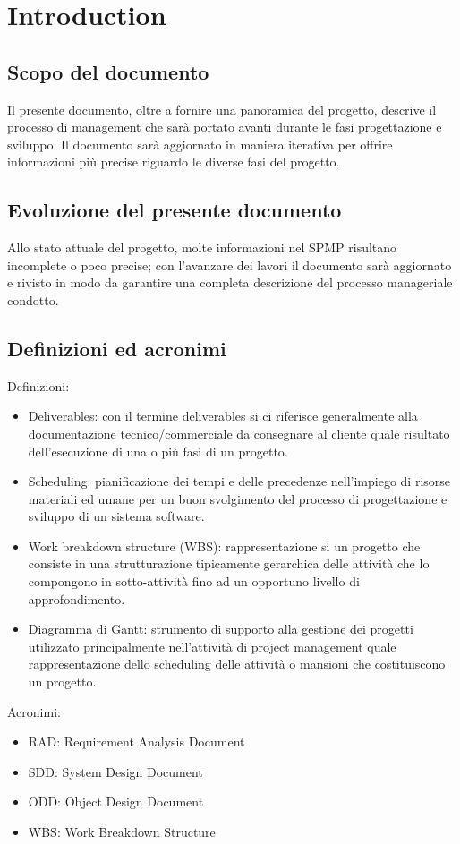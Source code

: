 \chapter{Introduction}
	
\section{Scopo del documento}
		
Il presente documento, oltre a fornire una panoramica del progetto, descrive il processo di management che sarà portato avanti durante le fasi progettazione e sviluppo. Il documento sarà aggiornato in maniera iterativa per offrire informazioni più precise riguardo le diverse fasi del progetto. 

\section{Evoluzione del presente documento}

Allo stato attuale del progetto, molte informazioni nel SPMP risultano incomplete o poco precise; con l’avanzare dei lavori il documento sarà aggiornato e rivisto in modo da garantire una completa descrizione del processo manageriale condotto.

\section{Definizioni ed acronimi}

Definizioni:			
\begin{itemize}
\item Deliverables: con il termine deliverables si ci riferisce generalmente alla documentazione tecnico/commerciale da consegnare al cliente quale risultato dell’esecuzione di una o più fasi di un progetto.
\item Scheduling: pianificazione dei tempi e delle precedenze nell’impiego di risorse materiali ed umane per un buon svolgimento del processo di progettazione e sviluppo di un sistema software.
\item Work breakdown structure (WBS): rappresentazione si un progetto che consiste in una strutturazione tipicamente gerarchica delle attività che lo compongono in sotto-attività fino ad un opportuno livello di approfondimento.
\item Diagramma di Gantt: strumento di supporto alla gestione dei progetti utilizzato principalmente nell’attività di project management quale rappresentazione dello scheduling delle attività o mansioni che costituiscono un progetto.
\end{itemize}	

Acronimi:
\begin{itemize}
\item RAD: Requirement Analysis Document
\item SDD: System Design Document
\item ODD: Object Design Document
\item WBS: Work Breakdown Structure
\end{itemize}